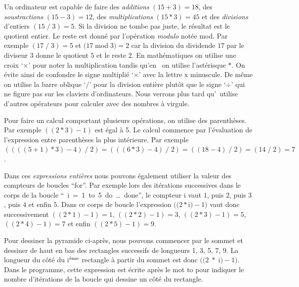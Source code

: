 Un ordinateur est capable de faire des {\em additions} $(15 + 3) = 18$, des {\em soustractions} 
$(15 - 3) = 12$, 
des {\em multiplications} $(15 \ast 3) = 45$ et des {\em divisions} d'entiers $(15 \;/\; 3) = 5$. 
Si la division ne tombe pas juste,
le résultat est le quotient entier. Le reste est donné
par l'opération {\em modulo} notée {\mcl mod}. Par exemple 
$(17 \;/\; 3) = 5$ et $(17 \;${\mcl mod}$\; 3) = 2$ car la division du dividende $17$
par le diviseur $3$ donne le quotient $5$ et le reste $2$. En mathématiques on utilise une croix
`$\times$' pour noter la multiplication tandis qu'en \ocaml\ on utilise l'astérisque $\ast$.
On évite ainsi de confondre le signe multiplié `$\times$' avec la lettre {\idt x} minuscule.
De même on utilise la barre oblique `$/$' pour la division entière plutôt que le signe
`$\div$' qui ne figure pas sur les claviers d'ordinateurs.
Nous verrons plus tard qu'\ocaml\ utilise d'autres opérateurs pour calculer avec des 
nombres à virgule.

Pour faire un calcul comportant plusieurs opérations, on utilise des pa\-ren\-thè\-ses. Par exemple
$((2 \ast 3) - 1)$ est égal à 5. Le calcul commence par l'évaluation de l'expression 
entre parenthèses la plus intérieure. 
Par exemple $((((5 + 1) \ast 3) - 4) \;/\; 2) = (((6 \ast 3) - 4) \;/\; 2) = 
((18 - 4) \;/\; 2) = (14 \;/\; 2) = 7$.  

Dans ces {\em expressions entières}
nous pouvons également utiliser la valeur des compteurs de boucles ``for''. Par exemple 
lors des itérations successives dans le corps de la boucle
``{\ i\ =\ 1\ {\mcl to}\ 5\ {\mcl do}\ \ldots\ {\mcl done}}'',
le compteur {\idt i} vaut $1$, puis $2$, puis $3$, puis $4$ et enfin $5$. 
Dans ce corps de boucle l'expression $((2 \ast ${\idt  i}$) - 1)$ vaut donc successivement 
$((2 \ast 1) - 1) = 1$, $((2 \ast 2) - 1) = 3$, $((2 \ast 3) - 1) = 5$, $((2 \ast 4) - 1) = 7$ et enfin
$((2 \ast 5) - 1) = 9$.

\begin{exemple}[Pyramide]
Pour dessiner la pyramide ci-après, nous pouvons commencer par le sommet et dessiner de
haut en bas des rectangles successifs de longueurs 1, 3, 5, 7, 9. La longueur du
côté du {\idt i}$^{\rm\grave{e}me}$ rectangle à partir du sommet est 
donc $((2\;\ast\;${\idt  i}$) - 1)$. Dans le programme, cette expression est écrite
après le mot {\mcl to} pour indiquer le nombre d'itérations de la boucle qui dessine un côté
du rectangle.

\pagebreak[3]
\vspace*{22mm}%
%
\vspace*{-22mm}%

\end{exemple}

